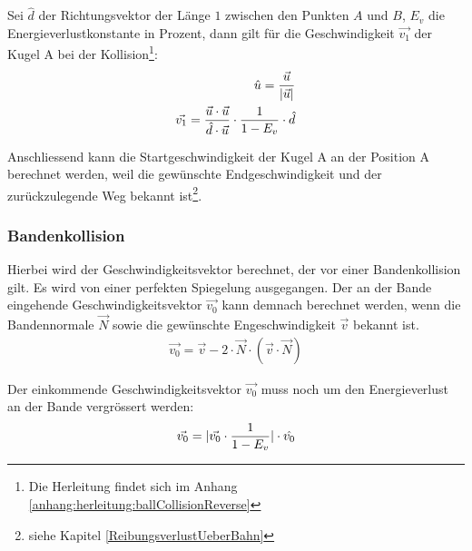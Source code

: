 Sei $\hat{d}$ der Richtungsvektor der Länge $1$ zwischen den Punkten $A$ und $B$, $E_v$ die Energieverlustkonstante in
Prozent, dann gilt für die Geschwindigkeit $\vec{v_1}$ der Kugel A bei der Kollision\footnote{Die Herleitung findet sich im Anhang \ref{anhang:herleitung:ballCollisionReverse}}:
\begin{align}
    \hat{u} = \frac{\vec{u}}{\lvert \vec{u} \rvert}\\
    \vec{v_1} = \frac{\vec{u} \cdot \vec{u}}{\hat{d} \cdot \vec{u}} \cdot \frac{1}{1 - E_v} \cdot \hat{d}
\end{align}

Anschliessend kann die Startgeschwindigkeit der Kugel A an der Position A berechnet werden, weil die gewünschte
Endgeschwindigkeit und der zurückzulegende Weg bekannt ist\footnote{siehe Kapitel \ref{ReibungsverlustUeberBahn}}.

\subsubsection{Bandenkollision}

Hierbei wird der Geschwindigkeitsvektor berechnet, der vor einer Bandenkollision gilt.
Es wird von einer perfekten Spiegelung ausgegangen. Der an der Bande eingehende
Geschwindigkeitsvektor $\vec{v_0}$ kann demnach berechnet werden, wenn die Bandennormale $\vec{N}$ sowie die
gewünschte Engeschwindigkeit $\vec{v}$ bekannt ist.
\begin{align}
    \vec{v_0} = \vec{v} - 2 \cdot \vec{N} \cdot (\vec{v} \cdot \vec{N})
\end{align}

Der einkommende Geschwindigkeitsvektor $\vec{v_0}$ muss noch um den Energieverlust an der Bande vergrössert werden:
\begin{align}
    \vec{v_0} = \lvert \vec{v_0} \cdot \frac{1}{1 - E_v} \rvert \cdot \hat{v_0}
\end{align}